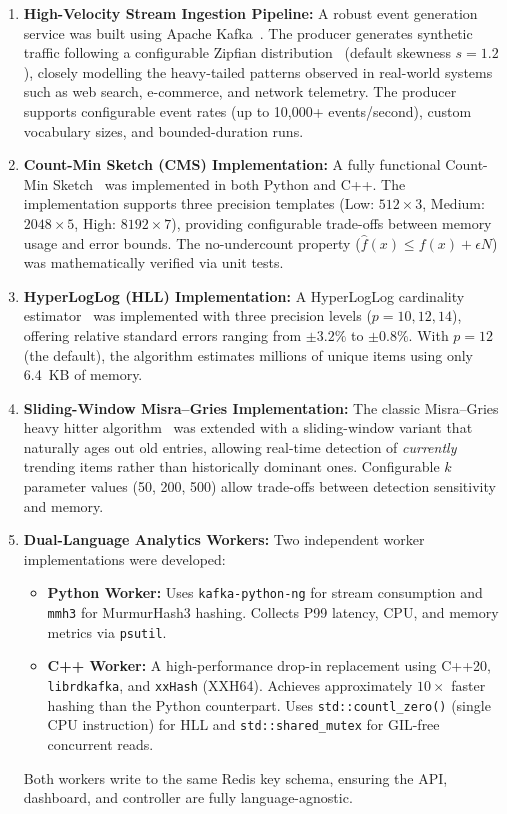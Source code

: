 \begin{enumerate}
 \item \textbf{High-Velocity Stream Ingestion Pipeline:}
 A robust event generation service was built using Apache Kafka~\cite{kafka}. The producer generates synthetic traffic following a configurable Zipfian distribution~\cite{zipf} (default skewness $s = 1.2$), closely modelling the heavy-tailed patterns observed in real-world systems such as web search, e-commerce, and network telemetry. The producer supports configurable event rates (up to 10,000+ events/second), custom vocabulary sizes, and bounded-duration runs.

 \item \textbf{Count-Min Sketch (CMS) Implementation:}
 A fully functional Count-Min Sketch~\cite{cms} was implemented in both Python and C++. The implementation supports three precision templates (Low: $512 \times 3$, Medium: $2048 \times 5$, High: $8192 \times 7$), providing configurable trade-offs between memory usage and error bounds. The no-undercount property ($\hat{f}(x) \le f(x) + \epsilon N$) was mathematically verified via unit tests.

 \item \textbf{HyperLogLog (HLL) Implementation:}
 A HyperLogLog cardinality estimator~\cite{hll} was implemented with three precision levels ($p = 10, 12, 14$), offering relative standard errors ranging from $\pm 3.2\%$ to $\pm 0.8\%$. With $p = 12$ (the default), the algorithm estimates millions of unique items using only 6.4~KB of memory.

 \item \textbf{Sliding-Window Misra--Gries Implementation:}
 The classic Misra--Gries heavy hitter algorithm~\cite{misra} was extended with a sliding-window variant that naturally ages out old entries, allowing real-time detection of \textit{currently} trending items rather than historically dominant ones. Configurable $k$ parameter values (50, 200, 500) allow trade-offs between detection sensitivity and memory.

 \item \textbf{Dual-Language Analytics Workers:}
 Two independent worker implementations were developed:
 \begin{itemize}
 \item \textbf{Python Worker:} Uses \texttt{kafka-python-ng} for stream consumption and \texttt{mmh3} for MurmurHash3 hashing. Collects P99 latency, CPU, and memory metrics via \texttt{psutil}.
 \item \textbf{C++ Worker:} A high-performance drop-in replacement using C++20, \texttt{librdkafka}, and \texttt{xxHash} (XXH64). Achieves approximately $10\times$ faster hashing than the Python counterpart. Uses \texttt{std::countl\_zero()} (single CPU instruction) for HLL and \texttt{std::shared\_mutex} for GIL-free concurrent reads.
 \end{itemize}
 Both workers write to the same Redis key schema, ensuring the API, dashboard, and controller are fully language-agnostic.


\end{enumerate}
